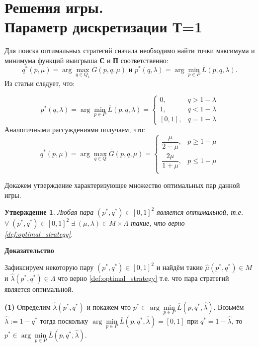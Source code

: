 \section{Решения игры. \\Параметр дискретизации Т=1}

Для поиска оптимальных стратегий сначала необходимо найти точки максимума и минимума 
функций выигрыша \textbf{С} и \textbf{П} соответственно:
$$
	q^*(p, \mu) = \arg \max \limits_{q \in Q_1} \overline G(p, q, \mu)
	\textrm{ и }
	p^*(q, \lambda) = \arg \min \limits_{p \in P} \overline L(p, q, \lambda).
$$
Из статьи \cite{novikova} следует, что:

\begin{equation}
	p^*(q, \lambda)=
	\arg \min \limits_{p \in P} \overline L(p, q, \lambda) =
	\begin{cases}
		0, & q > 1 - \lambda \\
		1, & q < 1 - \lambda \\
		[0,1], & q = 1 - \lambda
	\end{cases}
	\label{eq:argmin_L_1}
\end{equation}
Аналогичными рассуждениями получаем, что:
\begin{equation}
	q^*(p, \mu) = \arg \max \limits_{q \in Q} \overline G(p, q, \mu) =
	\begin{cases}
		\dfrac{\mu}{2 - \mu}, & p \geqslant 1 - \mu \\
		\dfrac{2\mu}{1 + \mu}, & p \leqslant 1 -\mu \\
	\end{cases}
	\label{eq:argmax_G_1}
\end{equation}

Докажем утверждение характеризующее множество оптимальных пар данной игры.

\newtheorem{State}{Утверждение}\label{State:opt_strat_1}
\begin{State}
	Любая пара $(p^*, q^*) \in [0, 1]^2$ является оптимальной, т.е.  
	$\forall \; (p^*, q^*) \in [0, 1]^2 \; \exists \; 
	(\mu, \lambda) \in M \times \Lambda$
	такие, что верно \eqref{def:optimal_strategy}.
\end{State}


\textbf{Доказательство}

Зафиксируем некоторую пару  $(p^*, q^*) \in [0, 1]^2$ и найдём такие 
$\hat \mu (p^*, q^*) \in M$ и $\hat \lambda (p^*, q^*) \in \Lambda$ 
что верно \eqref{def:optimal_strategy} т.е. что пара стратегий является оптимальной.

\textbf{(1)} Определим $\hat \lambda(p^*, q^*)$ и покажем что 
$p^* \in \arg \min \limits_{p \in P} \overline L(p, q^*, \hat \lambda)$.
Возьмём $\hat \lambda := 1 - q^*$ тогда поскольку 
$\arg \min\limits_{p \in P} \overline L(p, q^*, \hat \lambda) = [0,1]$ 
при $ q^* = 1 - \hat \lambda$, 
то $p^* \in \arg \min \limits_{p \in P} \overline L(p, q^*, \hat \lambda)$.

